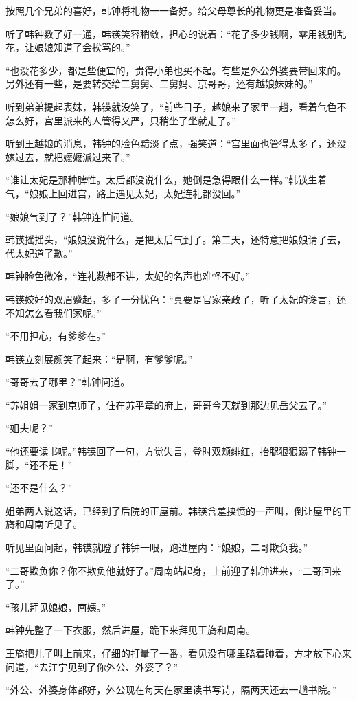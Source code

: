 按照几个兄弟的喜好，韩钟将礼物一一备好。给父母尊长的礼物更是准备妥当。

听了韩钟数了好一通，韩锳笑容稍敛，担心的说着：“花了多少钱啊，零用钱别乱花，让娘娘知道了会挨骂的。”

“也没花多少，都是些便宜的，贵得小弟也买不起。有些是外公外婆要带回来的。另外还有一些，是要转交给二舅舅、二舅妈、京哥哥，还有越娘妹妹的。”

听到弟弟提起表妹，韩锳就没笑了，“前些日子，越娘来了家里一趟，看着气色不怎么好，宫里派来的人管得又严，只稍坐了坐就走了。”

听到王越娘的消息，韩钟的脸色黯淡了点，强笑道：“宫里面也管得太多了，还没嫁过去，就把嬷嬷派过来了。”

“谁让太妃是那种脾性。太后都没说什么，她倒是急得跟什么一样。”韩锳生着气，“娘娘上回进宫，路上遇见太妃，太妃连礼都没回。”

“娘娘气到了？”韩钟连忙问道。

韩锳摇摇头，“娘娘没说什么，是把太后气到了。第二天，还特意把娘娘请了去，代太妃道了歉。”

韩钟脸色微冷，“连礼数都不讲，太妃的名声也难怪不好。”

韩锳姣好的双眉蹙起，多了一分忧色：“真要是官家亲政了，听了太妃的谗言，还不知怎么看我们家呢。”

“不用担心，有爹爹在。”

韩锳立刻展颜笑了起来：“是啊，有爹爹呢。”

“哥哥去了哪里？”韩钟问道。

“苏姐姐一家到京师了，住在苏平章的府上，哥哥今天就到那边见岳父去了。”

“姐夫呢？”

“他还要读书呢。”韩锳回了一句，方觉失言，登时双颊绯红，抬腿狠狠踢了韩钟一脚，“还不是！”

“还不是什么？”

姐弟两人说这话，已经到了后院的正屋前。韩锳含羞挟愤的一声叫，倒让屋里的王旖和周南听见了。

听见里面问起，韩锳就瞪了韩钟一眼，跑进屋内：“娘娘，二哥欺负我。”

“二哥欺负你？你不欺负他就好了。”周南站起身，上前迎了韩钟进来，“二哥回来了。”

“孩儿拜见娘娘，南姨。”

韩钟先整了一下衣服，然后进屋，跪下来拜见王旖和周南。

王旖把儿子叫上前来，仔细的打量了一番，看见没有哪里磕着碰着，方才放下心来问道，“去江宁见到了你外公、外婆了？”

“外公、外婆身体都好，外公现在每天在家里读书写诗，隔两天还去一趟书院。”

